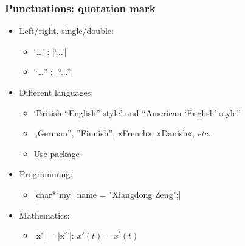 \begin{frame}[fragile]
\frametitle{Punctuations: quotation mark}
\begin{itemize}
  \item Left/right, single/double:
    \begin{itemize}
      \item `\ldots{}' : |`...'|
      \item ``\ldots{}'' : |``...''|
    \end{itemize}
  \item Different languages:
    \begin{itemize}
      \item `British ``English'' style' and ``American `English' style''
      \item „German'', ''Finnish'', «French», »Danish«, \emph{etc.}
      \item Use  package
    \end{itemize}
  \item Programming:
    \begin{itemize}
      \item |char* my_name = "Xiangdong Zeng";|
    \end{itemize}
  \item Mathematics:
    \begin{itemize}
      \item |x'| = |x^{\prime}|: $x'(t) = x^{\prime}(t)$
    \end{itemize}
\end{itemize}
\end{frame}

